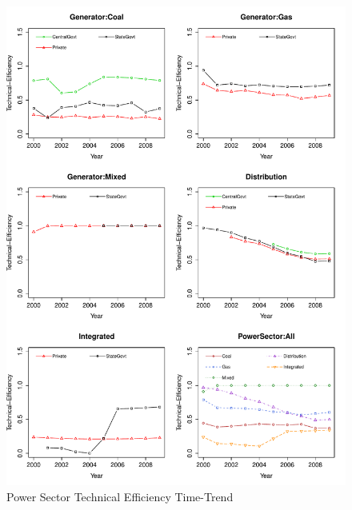 
\begin{figure}[h]
\centering
	\caption{Power Sector Technical Efficiency Time-Trend}
	\label{fig:EffTimeTrend}
	\centering
		\includegraphics[width=1.00\textwidth]{chapter02/EffTimeTrend.pdf}	
\end{figure}


